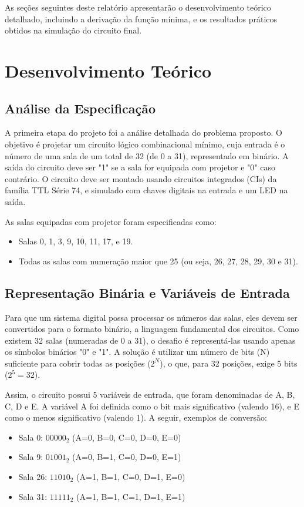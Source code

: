 \documentclass[a4paper, 12pt]{article}
\begin{document}
As seções seguintes deste relatório apresentarão o desenvolvimento teórico detalhado, incluindo a derivação da função mínima, e os resultados práticos obtidos na simulação do circuito final.


\section{Desenvolvimento Teórico}

\subsection{Análise da Especificação}
A primeira etapa do projeto foi a análise detalhada do problema proposto. O objetivo é projetar um circuito lógico combinacional mínimo, cuja entrada é o número de uma sala de um total de 32 (de 0 a 31), representado em binário. A saída do circuito deve ser "1" se a sala for equipada com projetor e "0" caso contrário. O circuito deve ser montado usando circuitos integrados (CIs) da família TTL Série 74, e simulado com chaves digitais na entrada e um LED na saída.

As salas equipadas com projetor foram especificadas como:
\begin{itemize}
    \item Salas 0, 1, 3, 9, 10, 11, 17, e 19.
    \item Todas as salas com numeração maior que 25 (ou seja, 26, 27, 28, 29, 30 e 31).
\end{itemize}

\subsection{Representação Binária e Variáveis de Entrada}
Para que um sistema digital possa processar os números das salas, eles devem ser convertidos para o formato binário, a linguagem fundamental dos circuitos. Como existem 32 salas (numeradas de 0 a 31), o desafio é representá-las usando apenas os símbolos binários "0" e "1". A solução é utilizar um número de bits (N) suficiente para cobrir todas as posições ($2^N$), o que, para 32 posições, exige 5 bits ($2^5 = 32$).

Assim, o circuito possui 5 variáveis de entrada, que foram denominadas de A, B, C, D e E. A variável A foi definida como o bit mais significativo (valendo 16), e E como o menos significativo (valendo 1). A seguir, exemplos de conversão:
\begin{itemize}
    \item Sala 0: $00000_2$ (A=0, B=0, C=0, D=0, E=0)
    \item Sala 9: $01001_2$ (A=0, B=1, C=0, D=0, E=1)
    \item Sala 26: $11010_2$ (A=1, B=1, C=0, D=1, E=0)
    \item Sala 31: $11111_2$ (A=1, B=1, C=1, D=1, E=1)
\end{itemize}
\end{document}

